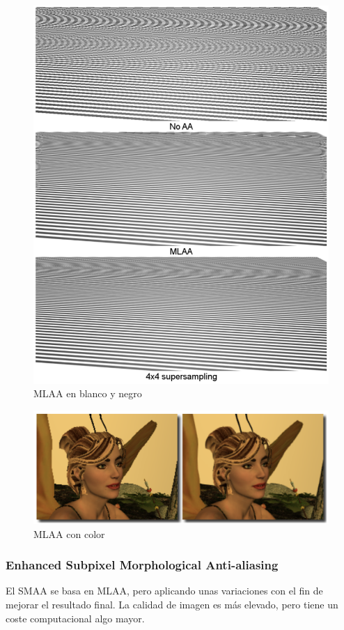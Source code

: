 \documentclass[withindex, glossary]{cam-thesis}
\begin{document}
\begin{figure}[!htbp]
    \includegraphics[width=.8\linewidth]{figures/mlaacomparison.png}
    \caption{MLAA en blanco y negro}
    \label{mlaacomparison}
\end{figure}

\begin{figure}[!htbp]
    \includegraphics[width=\linewidth]{figures/mlaares.png}
    \caption{MLAA con color}
    \label{mlaacomparison}
\end{figure}

\subsubsection{Enhanced Subpixel Morphological Anti-aliasing}

El SMAA\cite{Jimenez:2012:SES:2318858.2318861} se basa en MLAA, pero aplicando unas variaciones con el fin de mejorar el resultado final. La calidad de imagen es más elevado, pero tiene un coste computacional algo mayor.
\end{document}
